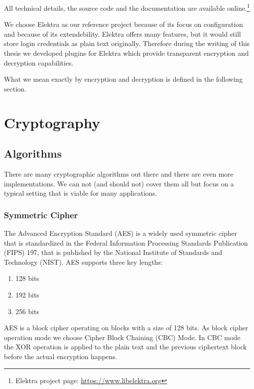 All technical details, the source code and the documentation are available online.\footnote{Elektra project page: \url{https://www.libelektra.org}}

We choose Elektra as our reference project because of its focus on configuration and because of its extendebility.
Elektra offers many features, but it would still store login credentials as plain text originally.
Therefore during the writing of this thesis we developed plugins for Elektra which provide transparent encryption and decryption capabilities.

What we mean exactly by encryption and decryption is defined in the following section.

\section{Cryptography}

\subsection{Algorithms}

There are many cryptographic algorithms out there and there are even more implementations.
We can not (and should not) cover them all but focus on a typical setting that is viable for many applications.

\subsubsection{Symmetric Cipher}

The Advanced Encryption Standard (AES) is a widely used symmetric cipher that is standardized in the Federal Information Processing Standards Publication (FIPS) 197, that is published by the National Institute of Standards and Technology (NIST).\cite{fips197}
AES supports three key lengths:
\begin{enumerate}
  \item 128 bits
  \item 192 bits
  \item 256 bits
\end{enumerate}

AES is a block cipher operating on blocks with a size of 128 bits.\cite{fips197,stallings2014} 
As block cipher operation mode we choose Cipher Block Chaining (CBC) Mode.
In CBC mode the XOR operation is applied to the plain text and the previous ciphertext block before the actual encryption happens.\cite{bruceschneier1996,stallings2014}

